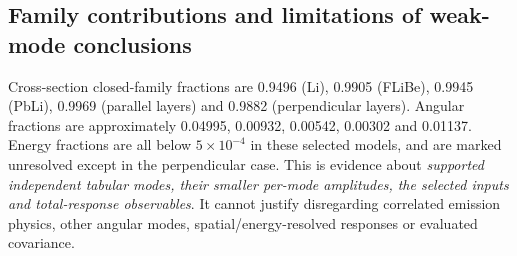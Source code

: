 \subsection{Family contributions and limitations of weak-mode conclusions}
Cross-section closed-family fractions are 0.9496 (Li), 0.9905 (FLiBe), 0.9945 (PbLi), 0.9969 (parallel layers) and 0.9882 (perpendicular layers). Angular fractions are approximately 0.04995, 0.00932, 0.00542, 0.00302 and 0.01137. Energy fractions are all below $5\times10^{-4}$ in these selected models, and are marked unresolved except in the perpendicular case. This is evidence about \emph{supported independent tabular modes, their smaller per-mode amplitudes, the selected inputs and total-response observables}. It cannot justify disregarding correlated emission physics, other angular modes, spatial/energy-resolved responses or evaluated covariance.

